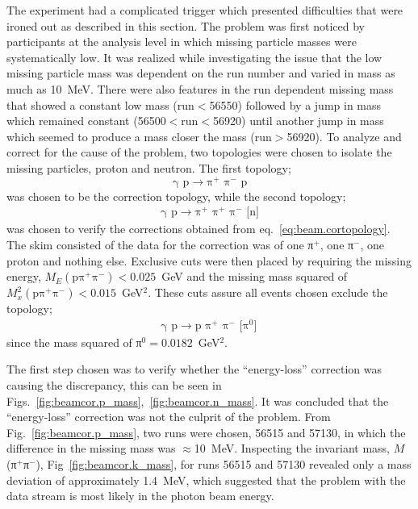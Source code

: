 The  experiment had a complicated trigger which presented difficulties that were ironed out as described in this section. The problem was first noticed by  participants at the analysis level in which missing particle masses were systematically low. It was realized while investigating the issue that the low missing particle mass was dependent on the run number and varied in mass as much as 10~MeV. There were also features in the run dependent missing mass that showed a constant low mass (run$<$56550) followed by a jump in mass which remained constant (56500$<$run$<$56920) until another jump in mass which seemed to produce a mass closer the  mass (run$>$56920). To analyze and correct for the cause of the problem, two topologies were chosen to isolate the missing particles, proton and neutron. The first topology;
\begin{equation}
    \text{γ p$\rightarrow$π$^+$ π$^-$ p}
    \label{eq:beam.cortopology}
\end{equation}
was chosen to be the correction topology, while the second topology;
\begin{align}
    \text{γ p$\rightarrow$π$^+$ π$^+$ π$^-$ [n]}
    \label{eq:beam.checktopology}
\end{align}
was chosen to verify the corrections obtained from eq.~\ref{eq:beam.cortopology}. The skim consisted of the data for the correction was of one   π$^+$, one   π$^-$, one   proton and nothing else. Exclusive cuts were then placed by requiring the missing energy, $M_E(\text{pπ$^+$π$^-$}) < 0.025$~GeV and the missing mass squared of $M_x^2(\text{pπ$^+$π$^-$}) < 0.015$~GeV$^2$. These cuts assure all events chosen exclude the topology;
\begin{align}
    \text{γ p}\rightarrow\text{p π$^+$ π$^-$ [π$^0$]} \nonumber \,
\end{align}
since the mass squared of π$^0 = 0.0182$~GeV$^2$.

The first step chosen was to verify whether the ``energy-loss'' correction was causing the discrepancy, this can be seen in Figs.~\ref{fig:beamcor.p_mass},~\ref{fig:beamcor.n_mass}. It was concluded that the ``energy-loss'' correction was not the culprit of the problem. From Fig.~\ref{fig:beamcor.p_mass}, two runs were chosen, 56515 and 57130, in which the difference in the missing mass was $\approx$10~MeV. Inspecting the invariant mass, $M$(π$^+$π$^-$), Fig~\ref{fig:beamcor.k_mass}, for runs 56515 and 57130 revealed only a mass deviation of approximately 1.4~MeV, which suggested that the problem with the  data stream is most likely in the photon beam energy.


